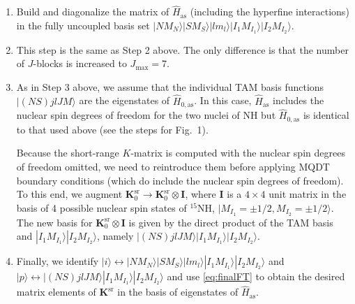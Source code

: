 \documentclass[reprint,amssymb,noeprint,twocolumn,longbibliography]{revtex4-2}
\begin{document}
\begin{enumerate}

\item
{
Build and diagonalize the matrix of $\hat{H}_\text{as}$ (including the hyperfine interactions) in the fully uncoupled basis set $|NM_N\rangle|SM_S\rangle|lm_l\rangle|I_1M_{I_1}\rangle|I_2M_{I_2}\rangle$. 
}


\item
{
This step is the same as Step 2 above. The only difference is that the number of $J$-blocks is increased to $J_\text{max}=7$. 
}

\item
{
As in Step 3 above, we assume that the individual TAM basis functions $|(NS)jlJM\rangle$ are the eigenstates of $\hat{H}_{0,\text{as}}$. In this case, $\hat{H}_\text{as}$ includes the nuclear spin degrees of freedom for the two nuclei of NH but $\hat{H}_{0,\text{as}}$ is identical to that used above (see the steps for Fig.~1).

Because the short-range $K$-matrix is computed with the nuclear spin degrees of freedom omitted, we need to reintroduce them  before applying MQDT boundary conditions (which do include the nuclear spin degrees of freedom). To this end, we augment $\bm{K}_\mathrm{0}^\text{sr}\to \bm{K}_\mathrm{0}^\text{sr}\otimes\bm{I}$, where $\bm{I}$ is a $4\times4$ unit matrix in the basis of 4 possible nuclear  spin states of $^{15}$NH, $|M_{I_1} =\pm1/2,M_{I_2} =\pm1/2\rangle$. 
The new basis for $\bm{K}_\mathrm{0}^\text{sr}\otimes\bm{I}$ is given by the direct product of the TAM basis and $|I_1M_{I_1}\rangle|I_2M_{I_2}\rangle$, namely $|(NS)jlJM\rangle|I_1M_{I_1}\rangle|I_2M_{I_2}\rangle$. 
}

\item
{
Finally, we identify $|i\rangle \leftrightarrow |NM_N\rangle|SM_S\rangle|lm_l\rangle|I_1M_{I_1}\rangle|I_2M_{I_2}\rangle$ and $|p\rangle \leftrightarrow |(NS)jlJM\rangle|I_1M_{I_1}\rangle|I_2M_{I_2}\rangle$ and use \cref{eq:finalFT} to obtain the desired matrix elements of $\bm{K}^{\text{sr}}$ in the basis of eigenstates of $\hat{H}_\text{as}$.
}


\end{enumerate}
\end{document}
